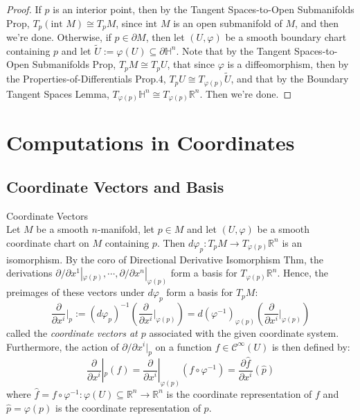 \begin{proof}
    If $p$ is an interior point, then by the Tangent Spaces-to-Open Submanifolds Prop, $T_p(\text{int }M) \cong T_pM$, since $\text{int }M$ is an open submanifold of $M$, and then we're done. Otherwise, if $p\in \partial M$, then let $(U,\varphi)$ be a smooth boundary chart containing $p$ and let $\widetilde{U} := \varphi(U) \subseteq \partial \mathbb{H}^n$. Note that by the Tangent Spaces-to-Open Submanifolds Prop, $T_pM \cong T_pU$, that since $\varphi$ is a diffeomorphism, then by the Properties-of-Differentials Prop.4, $T_pU\cong T_{\varphi(p)}\widetilde{U}$, and that by the Boundary Tangent Spaces Lemma, $T_{\varphi(p)} \mathbb{H}^n \cong T_{\varphi(p)} \mathbb{R}^n$. Then we're done.
\end{proof}


\section{Computations in Coordinates}

\subsection{Coordinate Vectors and Basis}

\begin{definition}{Coordinate Vectors}\\
Let $M$ be a smooth $n$-manifold, let $p \in M$ and let $(U,\varphi)$ be a smooth coordinate chart on $M$ containing $p$. Then $d\varphi_p: T_pM\to T_{\varphi(p)} \mathbb{R}^n$ is an isomorphism. By the coro of Directional Derivative Isomorphism Thm, the derivations $\partial/ \partial x^1|_{\varphi(p)} ,\cdots, \partial/\partial x^n |_{\varphi(p)}$ form a basis for $T_{\varphi(p)} \mathbb{R}^n$. Hence, the preimages of these vectors under $d\varphi_p$ form a basis for $T_pM$:
\[
\frac{\partial}{\partial x^i}|_p := (d\varphi_p)^{-1} (\frac{\partial}{\partial x^i} |_{\varphi(p)})= d(\varphi^{-1})_{\varphi(p)} (\frac{\partial}{\partial x^i} |_{\varphi(p)})
\]
called the \textit{coordinate vectors at $p$} associated with the given coordinate system. Furthermore, the action of $\partial/\partial x^i|_p$ on a function $f\in \mathcal{C}^\infty (U)$ is then defined by:
\[
\frac{\partial}{\partial x^i}|_p(f)= \frac{\partial}{\partial x^i}|_{\varphi(p)} (f\circ \varphi^{-1})= \frac{\partial \widehat{f}}{\partial x^i} (\widehat{p})
\]
where $\widehat{f}= f\circ \varphi^{-1}: \varphi(U) \subseteq \mathbb{R}^n \to \mathbb{R}^n$ is the coordinate representation of $f$ and $\widehat{p}= \varphi(p)$ is the coordinate representation of $p$.
\end{definition}

